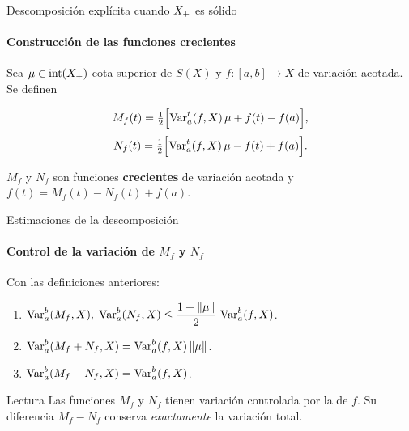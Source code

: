 
\begin{frame}{Descomposición explícita cuando $X_{+}$ es sólido}
\framesubtitle{Construcción de las funciones crecientes}

Sea $\mu\in\operatorname{int}(X_{+})$ cota superior de $S(X)$ y
$f:[a,b]\to X$ de variación acotada. Se definen

\[
M_f(t) = \tfrac{1}{2}\Bigl[\operatorname{Var}_a^t(f,X)\,\mu + f(t) - f(a)\Bigr],
\]
\[
N_f(t) = \tfrac{1}{2}\Bigl[\operatorname{Var}_a^t(f,X)\,\mu - f(t) + f(a)\Bigr].
\]

\medskip

\begin{theorem}
$M_f$ y $N_f$ son funciones \textbf{crecientes} de variación acotada y
$f(t) = M_f(t) - N_f(t) + f(a)$.
\end{theorem}


\end{frame}


\begin{frame}{Estimaciones de la descomposición}
\framesubtitle{Control de la variación de $M_f$ y $N_f$}

\begin{theorem}
Con las definiciones anteriores:
\begin{enumerate}
    \item $\operatorname{Var}_a^b(M_f,X),\;\operatorname{Var}_a^b(N_f,X) \le
          \dfrac{1+\|\mu\|}{2}\,\operatorname{Var}_a^b(f,X)$.
    \item $\operatorname{Var}_a^b(M_f+N_f,X) = \operatorname{Var}_a^b(f,X)\,\|\mu\|$.
    \item $\operatorname{Var}_a^b(M_f-N_f,X) = \operatorname{Var}_a^b(f,X)$.
\end{enumerate}
\end{theorem}

\medskip
\begin{block}{Lectura}
Las funciones $M_f$ y $N_f$ tienen variación controlada por la de $f$.
Su diferencia $M_f - N_f$ conserva \emph{exactamente} la variación total.
\end{block}

\end{frame}

